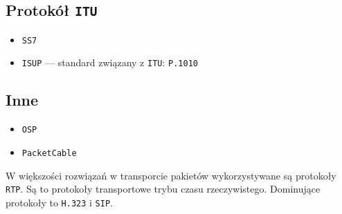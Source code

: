 \documentclass[a4paper]{article}
\begin{document}
\subsection{Protokół {\tt ITU}}
\begin{itemize}
    \item {\tt SS7}
    \item {\tt ISUP} --- standard związany z {\tt ITU}: {\tt P.1010}
\end{itemize}
\subsection{Inne}
\begin{itemize}
    \item {\tt OSP}
    \item {\tt PacketCable}
\end{itemize}
W większości rozwiązań w transporcie pakietów wykorzystywane są protokoły {\tt RTP}.
Są to protokoły transportowe trybu czasu rzeczywistego.
Dominujące protokoły to {\tt H.323} i {\tt SIP}.
\end{document}
